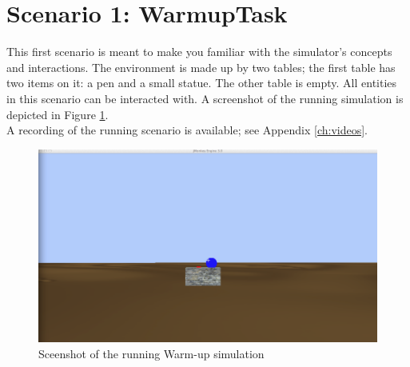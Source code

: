 \section{Scenario 1: WarmupTask} %
\label{sec:eval_warmup_scenario}
This first scenario is meant to make you familiar with the simulator's concepts and interactions. The environment is made up by two tables; the first table has two items on it: a pen and a small statue. The other table is empty. All entities in this scenario can be interacted with. A screenshot of the running simulation is depicted in Figure \ref{fig:eval_warump}.\\

A recording of the running scenario is available; see Appendix \ref{ch:videos}.\\

\begin{figure}[H]
	\centering
	\includegraphics[width=0.8\linewidth]{gfx/Chapter_EvaluationScenarios/prototype1}
	\caption{Sceenshot of the running Warm-up simulation}
	\label{fig:eval_warump}
\end{figure}

